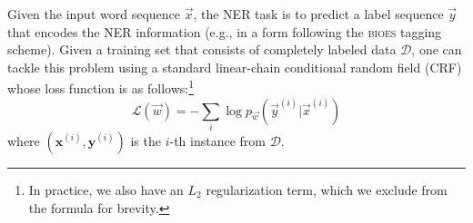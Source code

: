 Given the input word sequence $\vec{x}$, the NER task is to predict a label sequence $\vec{y}$ that encodes the NER information (e.g., in a form following the \textsc{bioes} tagging scheme). Given a training set that consists of completely labeled data $\mathcal{D}$, one can tackle this problem using a standard linear-chain conditional random field (CRF) \cite{lafferty2001conditional} whose loss function is as follows:\footnote{In practice, we also have an $L_2$ regularization term, which we exclude from the formula for brevity.}
\begin{equation}
\mathcal{L}(\vec{w}) 
=
-
\sum_{i}
\log
p_{\vec{w}} (\vec{y}^{(i)} \vert \vec{x}^{(i)}) 
\end{equation}
where $(\mathbf{x}^{(i)}, \mathbf{y}^{(i)})$ is the $i$-th instance from $\mathcal{D}$. 



